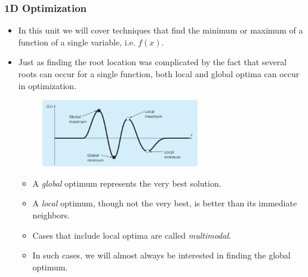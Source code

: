 \documentclass{if-beamer}
\begin{document}
\begin{frame}[t]
	\frametitle{1D Optimization}
	\begin{itemize}
		\item In this unit we will cover techniques that find the minimum or maximum of a function of a single variable, i.e. $f(x)$.
		\item Just as finding the root location was complicated by the fact that several roots can occur for a single function, both local
		and global optima can occur in optimization.
		\begin{figure}
			\centering
			\includegraphics[width = 0.65\textwidth]{figures/localglobal}
		\end{figure}
		\begin{itemize}
			\item A \textit{global} optimum represents the very best solution. 
			\item A \textit{local} optimum, though not the very best, is better than its immediate neighbors. 
			\item Cases that include local optima are called \textit{multimodal}. 
			\item In such cases, we will almost always be interested in finding the global optimum. 
		\end{itemize}
	\end{itemize}
\end{frame}
\end{document}
